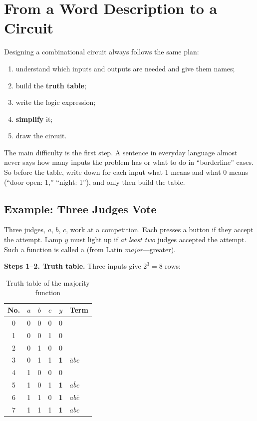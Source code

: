 \section{From a Word Description to a Circuit}

Designing a combinational circuit always follows the same plan:
\begin{enumerate}
  \item understand which inputs and outputs are needed and give them names;
  \item build the \textbf{truth table};
  \item write the logic expression;
  \item \textbf{simplify} it;
  \item draw the circuit.
\end{enumerate}

The main difficulty is the first step. A sentence in everyday language almost
never says how many inputs the problem has or what to do in ``borderline''
cases. So before the table, write down for each input what 1 means and what 0
means (``door open: 1,'' ``night: 1''), and only then build the table.

\subsection{Example: Three Judges Vote}

Three judges, $a$, $b$, $c$, work at a competition. Each presses a button if
they accept the attempt. Lamp $y$ must light up if \emph{at least two}
judges accepted the attempt. Such a function is called a
 (from Latin \emph{major}---greater).

\textbf{Steps 1--2. Truth table.} Three inputs give $2^3 = 8$ rows:

\begin{table}[H]
\centering
\caption{Truth table of the majority function}
\label{tab:maj}
\begin{tabular}{c|ccc|c|l}
\toprule
\textbf{No.} & $a$ & $b$ & $c$ & $y$ & \textbf{Term} \\
\midrule
0 & 0 & 0 & 0 & 0 & \\
1 & 0 & 0 & 1 & 0 & \\
2 & 0 & 1 & 0 & 0 & \\
3 & 0 & 1 & 1 & \textbf{1} & $\overline{a}bc$ \\
4 & 1 & 0 & 0 & 0 & \\
5 & 1 & 0 & 1 & \textbf{1} & $a\overline{b}c$ \\
6 & 1 & 1 & 0 & \textbf{1} & $ab\overline{c}$ \\
7 & 1 & 1 & 1 & \textbf{1} & $abc$ \\
\bottomrule
\end{tabular}
\end{table}

